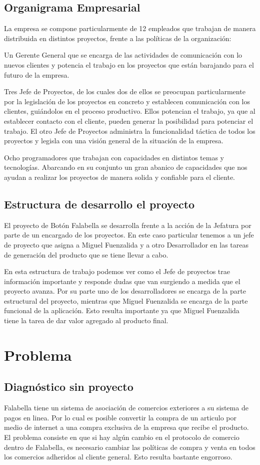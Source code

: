 \documentclass[a4paper,12pt,openany,oneside]{book}
\begin{document}
\section{Organigrama Empresarial}
La empresa se compone particularmente de 12 empleados que trabajan de manera distribuida en distintos proyectos, frente a las políticas de la organización:

Un Gerente General que se encarga de las actividades de comunicación con lo nuevos clientes y potencia el trabajo en los proyectos que están barajando para el futuro de la empresa.

Tres Jefe de Proyectos, de los cuales dos de ellos se preocupan particularmente por la legislación de los proyectos en concreto y establecen comunicación con los clientes, guiándolos en el proceso productivo. Ellos potencian el trabajo, ya que al establecer contacto con el cliente, pueden generar la posibilidad para potenciar el trabajo. El otro Jefe de Proyectos administra la funcionalidad táctica de todos los proyectos y legisla con una visión general de la situación de la empresa.

Ocho programadores que trabajan con capacidades en distintos temas y tecnologías. Abarcando en su conjunto un gran abanico de capacidades que nos ayudan a realizar los proyectos de manera solida y confiable para el cliente.
\section{Estructura de desarrollo el proyecto}
El proyecto de Botón Falabella se desarrolla frente a la acción de la Jefatura por parte de un encargado de los proyectos. En este caso particular tenemos a un jefe de proyecto que asigna a Miguel Fuenzalida y a otro Desarrollador en las tareas de generación del producto que se tiene llevar a cabo.

En esta estructura de trabajo podemos ver como el Jefe de proyectos trae información importante y responde dudas que van surgiendo a medida que el proyecto avanza. Por su parte uno de los desarrolladores se encarga de la parte estructural del proyecto, mientras que Miguel Fuenzalida se encarga de la parte funcional de la aplicación. Esto resulta importante ya que Miguel Fuenzalida tiene la tarea de dar valor agregado al producto final.
\chapter{Problema}
\thispagestyle{empty}
\section{Diagnóstico sin proyecto}
Falabella tiene un sistema de asociación de comercios exteriores a su sistema de pagos en linea. Por lo cual es posible convertir la compra de un articulo por medio de internet a una compra exclusiva de la empresa que recibe el producto. El problema consiste en que si hay algún cambio en el protocolo de comercio dentro de Falabella, es necesario cambiar las políticas de compra y venta en todos los comercios adheridos al cliente general. Esto resulta bastante engorroso. 
\end{document}
